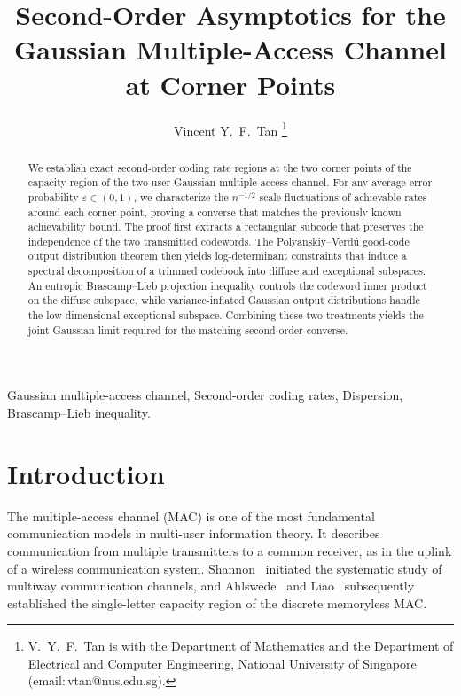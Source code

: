 \documentclass[11pt,onecolumn]{IEEEtran}
\newcommand{\eps}{\varepsilon}
\begin{document}
\flushbottom
\title{Second-Order Asymptotics for the  Gaussian Multiple-Access Channel at  Corner Points} 

\author{Vincent Y.~F.~Tan  %
\thanks{V.~Y.~F.~Tan is with the Department of Mathematics and 
the Department of Electrical and Computer Engineering, National University of Singapore
(email:\,vtan@nus.edu.sg).
}}
 
\IEEEpeerreviewmaketitle

\maketitle
\begin{abstract}
We establish  exact second-order coding rate regions at the two corner points of the capacity region of the two-user Gaussian multiple-access channel. For any  average error probability $\eps\in(0,1)$, we characterize the $n^{-1/2}$-scale fluctuations of achievable rates around each corner point, proving a converse that matches the previously known achievability bound. The proof first extracts a rectangular subcode that preserves the independence of the two transmitted codewords. The Polyanskiy--Verd\'u good-code output distribution theorem then yields log-determinant constraints that induce a spectral decomposition of a trimmed codebook into diffuse and exceptional subspaces. An entropic Brascamp--Lieb projection inequality controls the codeword inner product on the diffuse subspace, while variance-inflated Gaussian output distributions handle the low-dimensional exceptional subspace. Combining these two treatments yields the joint Gaussian limit required for the matching second-order converse.
\end{abstract}

\begin{IEEEkeywords} 
Gaussian multiple-access channel, Second-order coding rates, Dispersion, Brascamp--Lieb inequality. 
\end{IEEEkeywords}
 
\section{Introduction}
The multiple-access channel (MAC) is one of the most fundamental communication  models in multi-user information theory. It describes communication from multiple transmitters to a common receiver, as in the uplink of a wireless communication system. Shannon~\cite{Shannon1961TwoWay} initiated the systematic study of multiway communication channels, and Ahlswede~\cite{Ahlswede1971Multiway,Ahlswede1974TwoSenders} and Liao~\cite{Liao1972MultipleAccess} subsequently established the single-letter capacity region of the discrete memoryless MAC.
\end{document}
